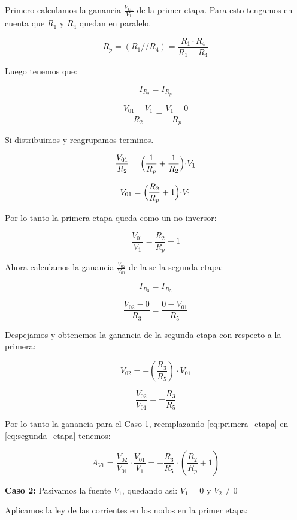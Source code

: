 Primero calculamos la ganancia $\frac{V_{O1}}{V_1}$ de la primer etapa. Para esto tengamos en cuenta que $R_1$ y $R_4$ quedan en paralelo. 

\vspace{1em}

\[{R_p = {(R_1 // R_4)} = \frac{R_1 \cdot R_4}{R_1 + R_4}}\]

Luego tenemos que: 

\[I_{R_2} = I_{R_p}\]

\[\frac{V_{01} - V_1}{R_2}
      = \frac{V_1 - 0}{R_p}\]

Si distribuimos y reagrupamos terminos.

\[\frac{V_{01}}{R_2} = \Bigl(\frac{1}{R_p}+\frac{1}{R_2}\Bigl) \cdot {V_1}\]
      
\[{V_{01}} = \Bigl(\frac{R_2}{R_p}+{1}\Bigl) \cdot {V_1}\]

Por lo tanto la primera etapa queda como un no inversor:


\begin{equation}\label{eq:primera_etapa} 
\frac{V_{01}}{V_1} = \frac{R_2}{R_p}+{1}
\end{equation}

      
Ahora calculamos la ganancia $\frac{V_{02}}{V_{01}}$ de la se la segunda etapa:

\[I_{R_3} = I_{R_5}\]


\[\frac{V_{02} - 0 }{R_3} = \frac{0 - V_{01}}{R_5}\]


Despejamos y obtenemos la ganancia de la segunda etapa con respecto a la primera:

\[V_{02} = -(\frac{R_3}{R_5}) \cdot {V_{01}}\]   


\begin{equation}\label{eq:segunda_etapa} 
\frac{V_{02}}{V_{01}} = -\frac{R_3}{R_5}
\end{equation}

Por lo tanto la ganancia para el Caso 1, reemplazando \eqref{eq:primera_etapa} en \eqref{eq:segunda_etapa} tenemos:

\[ A_{V1} = \frac{V_{02}}{V_{01}} \cdot \frac{V_{01}}{V_1} = -\frac{R_3}{R_5} \cdot (\frac{R_2}{R_p}+{1})  \]

\vspace{1em}

\textbf{Caso 2:} Pasivamos la fuente $V_1$, quedando asi: $V_1 = 0$ y $V_2 \neq 0$

\vspace{1em}

Aplicamos la ley de las corrientes en los nodos en la primer etapa:


